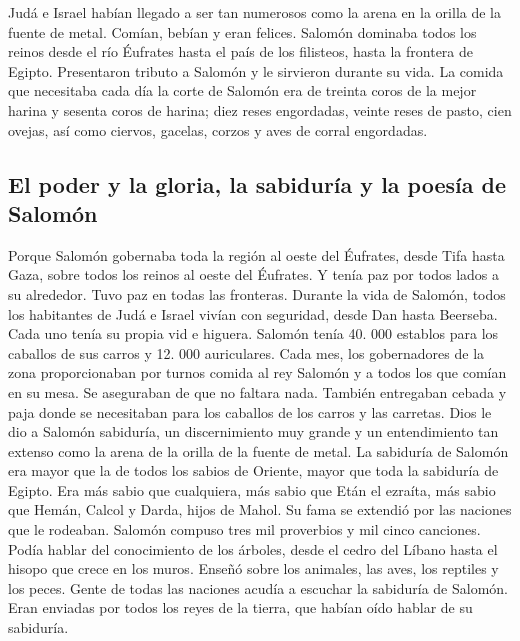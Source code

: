  Judá e Israel habían llegado a ser tan numerosos como la
arena en la orilla de la fuente de metal. Comían, bebían y eran felices.
 Salomón dominaba todos los reinos desde el río Éufrates
hasta el país de los filisteos, hasta la frontera de Egipto. Presentaron
tributo a Salomón y le sirvieron durante su vida.  La
comida que necesitaba cada día la corte de Salomón era de treinta coros
de la mejor harina y sesenta coros de harina;  diez reses
engordadas, veinte reses de pasto, cien ovejas, así como ciervos,
gacelas, corzos y aves de corral engordadas.

\hypertarget{el-poder-y-la-gloria-la-sabiduruxeda-y-la-poesuxeda-de-salomuxf3n}{%
\subsection{El poder y la gloria, la sabiduría y la poesía de
Salomón}\label{el-poder-y-la-gloria-la-sabiduruxeda-y-la-poesuxeda-de-salomuxf3n}}

 Porque Salomón gobernaba toda la región al oeste del
Éufrates, desde Tifa hasta Gaza, sobre todos los reinos al oeste del
Éufrates. Y tenía paz por todos lados a su alrededor. Tuvo paz en todas
las fronteras.  Durante la vida de Salomón, todos los
habitantes de Judá e Israel vivían con seguridad, desde Dan hasta
Beerseba. Cada uno tenía su propia vid e higuera. 
Salomón tenía 40. 000 establos para los caballos de sus carros y 12. 000
auriculares.  Cada mes, los gobernadores de la zona
proporcionaban por turnos comida al rey Salomón y a todos los que comían
en su mesa. Se aseguraban de que no faltara nada. 
También entregaban cebada y paja donde se necesitaban para los caballos
de los carros y las carretas.  Dios le dio a Salomón
sabiduría, un discernimiento muy grande y un entendimiento tan extenso
como la arena de la orilla de la fuente de metal.  La
sabiduría de Salomón era mayor que la de todos los sabios de Oriente,
mayor que toda la sabiduría de Egipto.  Era más sabio que
cualquiera, más sabio que Etán el ezraíta, más sabio que Hemán, Calcol y
Darda, hijos de Mahol. Su fama se extendió por las naciones que le
rodeaban.  Salomón compuso tres mil proverbios y mil
cinco canciones.  Podía hablar del conocimiento de los
árboles, desde el cedro del Líbano hasta el hisopo que crece en los
muros. Enseñó sobre los animales, las aves, los reptiles y los peces.
 Gente de todas las naciones acudía a escuchar la
sabiduría de Salomón. Eran enviadas por todos los reyes de la tierra,
que habían oído hablar de su sabiduría.

